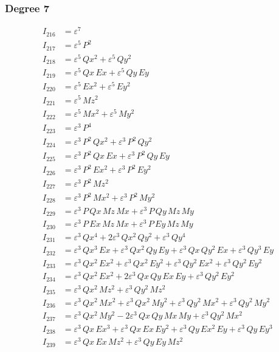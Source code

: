 \documentclass{article}
\begin{document}
\subsubsection*{Degree 7}

\begin{align*}
I_{216} &= ε^{7} \\
I_{217} &= ε^{5}\,P^{2} \\
I_{218} &= ε^{5}\,Qx^{2} + ε^{5}\,Qy^{2} \\
I_{219} &= ε^{5}\,Qx\,Ex + ε^{5}\,Qy\,Ey \\
I_{220} &= ε^{5}\,Ex^{2} + ε^{5}\,Ey^{2} \\
I_{221} &= ε^{5}\,Mz^{2} \\
I_{222} &= ε^{5}\,Mx^{2} + ε^{5}\,My^{2} \\
I_{223} &= ε^{3}\,P^{4} \\
I_{224} &= ε^{3}\,P^{2}\,Qx^{2} + ε^{3}\,P^{2}\,Qy^{2} \\
I_{225} &= ε^{3}\,P^{2}\,Qx\,Ex + ε^{3}\,P^{2}\,Qy\,Ey \\
I_{226} &= ε^{3}\,P^{2}\,Ex^{2} + ε^{3}\,P^{2}\,Ey^{2} \\
I_{227} &= ε^{3}\,P^{2}\,Mz^{2} \\
I_{228} &= ε^{3}\,P^{2}\,Mx^{2} + ε^{3}\,P^{2}\,My^{2} \\
I_{229} &= ε^{3}\,P\,Qx\,Mz\,Mx + ε^{3}\,P\,Qy\,Mz\,My \\
I_{230} &= ε^{3}\,P\,Ex\,Mz\,Mx + ε^{3}\,P\,Ey\,Mz\,My \\
I_{231} &= ε^{3}\,Qx^{4} + 2ε^{3}\,Qx^{2}\,Qy^{2} + ε^{3}\,Qy^{4} \\
I_{232} &= ε^{3}\,Qx^{3}\,Ex + ε^{3}\,Qx^{2}\,Qy\,Ey + ε^{3}\,Qx\,Qy^{2}\,Ex + ε^{3}\,Qy^{3}\,Ey \\
I_{233} &= ε^{3}\,Qx^{2}\,Ex^{2} + ε^{3}\,Qx^{2}\,Ey^{2} + ε^{3}\,Qy^{2}\,Ex^{2} + ε^{3}\,Qy^{2}\,Ey^{2} \\
I_{234} &= ε^{3}\,Qx^{2}\,Ex^{2} + 2ε^{3}\,Qx\,Qy\,Ex\,Ey + ε^{3}\,Qy^{2}\,Ey^{2} \\
I_{235} &= ε^{3}\,Qx^{2}\,Mz^{2} + ε^{3}\,Qy^{2}\,Mz^{2} \\
I_{236} &= ε^{3}\,Qx^{2}\,Mx^{2} + ε^{3}\,Qx^{2}\,My^{2} + ε^{3}\,Qy^{2}\,Mx^{2} + ε^{3}\,Qy^{2}\,My^{2} \\
I_{237} &= ε^{3}\,Qx^{2}\,My^{2} - 2ε^{3}\,Qx\,Qy\,Mx\,My + ε^{3}\,Qy^{2}\,Mx^{2} \\
I_{238} &= ε^{3}\,Qx\,Ex^{3} + ε^{3}\,Qx\,Ex\,Ey^{2} + ε^{3}\,Qy\,Ex^{2}\,Ey + ε^{3}\,Qy\,Ey^{3} \\
I_{239} &= ε^{3}\,Qx\,Ex\,Mz^{2} + ε^{3}\,Qy\,Ey\,Mz^{2} \\

\end{align*}
\end{document}
